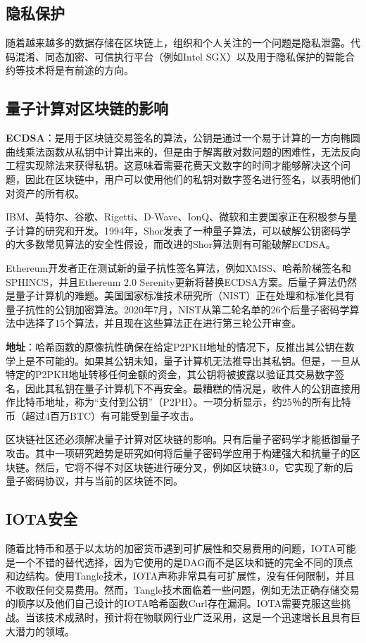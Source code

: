 \begin{translation}
\subsection{隐私保护}
随着越来越多的数据存储在区块链上，组织和个人关注的一个问题是隐私泄露。代码混淆、同态加密、可信执行平台（例如Intel SGX）以及用于隐私保护的智能合约等技术将是有前途的方向。

\subsection{量子计算对区块链的影响}
\textbf{ECDSA}：是用于区块链交易签名的算法，公钥是通过一个易于计算的一方向椭圆曲线乘法函数从私钥中计算出来的，但是由于解离散对数问题的困难性，无法反向工程实现除法来获得私钥。这意味着需要花费天文数字的时间才能够解决这个问题，因此在区块链中，用户可以使用他们的私钥对数字签名进行签名，以表明他们对资产的所有权。

IBM、英特尔、谷歌、Rigetti、D-Wave、IonQ、微软和主要国家正在积极参与量子计算的研究和开发。1994年，Shor发表了一种量子算法，可以破解公钥密码学的大多数常见算法的安全性假设\cite{art141}，而改进的Shor算法则有可能破解ECDSA\cite{art142}。

Ethereum开发者正在测试新的量子抗性签名算法，例如XMSS、哈希阶梯签名和SPHINCS，并且Ethereum 2.0 Serenity更新将替换ECDSA方案。后量子算法仍然是量子计算机的难题。美国国家标准技术研究所（NIST）正在处理和标准化具有量子抗性的公钥加密算法。2020年7月，NIST从第二轮名单的26个后量子密码学算法中选择了15个算法，并且现在这些算法正在进行第三轮公开审查\cite{art143}。

\textbf{地址}：哈希函数的原像抗性确保在给定P2PKH地址的情况下，反推出其公钥在数学上是不可能的。如果其公钥未知，量子计算机无法推导出其私钥。但是，一旦从特定的P2PKH地址转移任何金额的资金，其公钥将被披露以验证其交易数字签名，因此其私钥在量子计算机下不再安全。最糟糕的情况是，收件人的公钥直接用作比特币地址，称为“支付到公钥”（P2PH）。一项分析显示，约25％的所有比特币（超过4百万BTC）有可能受到量子攻击\cite{art144}。

区块链社区还必须解决量子计算对区块链的影响。只有后量子密码学才能抵御量子攻击。其中一项研究趋势是研究如何将后量子密码学应用于构建强大和抗量子的区块链。然后，它将不得不对区块链进行硬分叉，例如区块链3.0，它实现了新的后量子密码协议，并与当前的区块链不同。

\subsection{IOTA安全}
随着比特币和基于以太坊的加密货币遇到可扩展性和交易费用的问题，IOTA可能是一个不错的替代选择，因为它使用的是DAG而不是区块和链的完全不同的顶点和边结构。使用Tangle技术，IOTA声称非常具有可扩展性，没有任何限制，并且不收取任何交易费用。然而，Tangle技术面临着一些问题，例如无法正确存储交易的顺序\cite{art145}以及他们自己设计的IOTA哈希函数Curl存在漏洞。IOTA需要克服这些挑战。当该技术成熟时，预计将在物联网行业广泛采用，这是一个迅速增长且具有巨大潜力的领域。


\end{translation}
